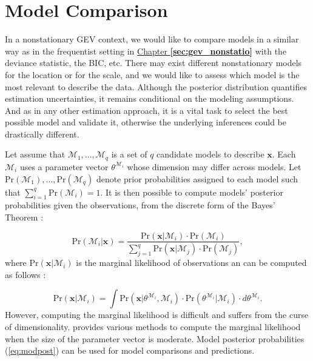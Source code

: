 

\section{Model Comparison}\label{sec:modcompbay}


In a nonstationary GEV context, we would like to compare models in a similar way as in the frequentist setting in \hyperref[sec:gev_nonstatio]{Chapter \textbf{\ref{sec:gev_nonstatio}}} with the deviance statistic, the BIC, etc.
There may exist different nonstationary models for the location or for the scale, and we would like to assess which model is the most relevant to describe the data.
Although the posterior distribution quantifies estimation uncertainties, it remains conditional on the modeling assumptions. And as in any other estimation approach, it is a vital task to select the best possible model and validate it, otherwise the underlying inferences could be drastically different. 

Let assume that $\mathcal{M}_1,\ldots,\mathcal{M}_q$ is a set of $q$ candidate models to describe $\boldsymbol{x}$. Each $\mathcal{M}_i$ uses a parameter vector $\theta^{\mathcal{M}_i}$ whose dimension may differ across models. Let $\text{Pr}(\mathcal{M}_1),\ldots,\text{Pr}(\mathcal{M}_q)$ denote prior probabilities assigned to each model such that $\sum_{i=1}^q \text{Pr}(\mathcal{M}_i)=1$.
It is then possible to compute models' posterior probabilities given the observations, from the discrete form of the Bayes' Theorem : 

\begin{equation}\label{eq:modpost}
\text{Pr}(\mathcal{M}_i|\boldsymbol{x})=\frac{\text{Pr}(\boldsymbol{x}|\mathcal{M}_i)\cdot \text{Pr}(\mathcal{M}_i)}{\sum_{j=1}^q \text{Pr}(\boldsymbol{x}|\mathcal{M}_j)\cdot \text{Pr}(\mathcal{M}_j)},
\end{equation}
where $\text{Pr}(\boldsymbol{x}|\mathcal{M}_i)$ is the marginal likelihood of observations an can be computed as follows : 

\begin{equation}\label{eq:marglik}
\text{Pr}(\boldsymbol{x}|\mathcal{M}_i)=\int \text{Pr}(\boldsymbol{x}|\theta^{\mathcal{M}_i},\mathcal{M}_i)\cdot \text{Pr}(\theta^{\mathcal{M}_i}|\mathcal{M}_i)\cdot d\theta^{\mathcal{M}_i}.
\end{equation}
However, computing the marginal likelihood is difficult and suffers from the curse of dimensionality. \citet{Bos2002} provides various methods to compute the marginal likelihood when the size of the parameter vector is moderate.
Model posterior probabilities (\ref{eq:modpost}) can be used for model comparisons and predictions.

